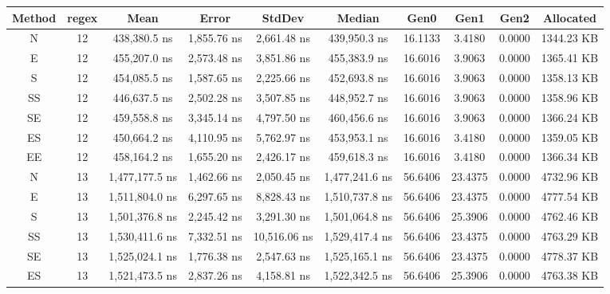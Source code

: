 \begin{sidewaystable}
    \begin{tabular}{|c|c|c|c|c|c|c|c|c|c|}
        \hline
        Method & regex & Mean           & Error        & StdDev       & Median         & Gen0     & Gen1     & Gen2   & Allocated   \\
        \hline
        N      & 12    & 438,380.5 ns   & 1,855.76 ns  & 2,661.48 ns  & 439,950.3 ns   & 16.1133  & 3.4180   & 0.0000 & 1344.23 KB  \\
        E      & 12    & 455,207.0 ns   & 2,573.48 ns  & 3,851.86 ns  & 455,383.9 ns   & 16.6016  & 3.9063   & 0.0000 & 1365.41 KB  \\
        S      & 12    & 454,085.5 ns   & 1,587.65 ns  & 2,225.66 ns  & 452,693.8 ns   & 16.6016  & 3.9063   & 0.0000 & 1358.13 KB  \\
        SS     & 12    & 446,637.5 ns   & 2,502.28 ns  & 3,507.85 ns  & 448,952.7 ns   & 16.6016  & 3.9063   & 0.0000 & 1358.96 KB  \\
        SE     & 12    & 459,558.8 ns   & 3,345.14 ns  & 4,797.50 ns  & 460,456.6 ns   & 16.6016  & 3.9063   & 0.0000 & 1366.24 KB  \\
        ES     & 12    & 450,664.2 ns   & 4,110.95 ns  & 5,762.97 ns  & 453,953.1 ns   & 16.6016  & 3.4180   & 0.0000 & 1359.05 KB  \\
        EE     & 12    & 458,164.2 ns   & 1,655.20 ns  & 2,426.17 ns  & 459,618.3 ns   & 16.6016  & 3.4180   & 0.0000 & 1366.34 KB  \\
        N      & 13    & 1,477,177.5 ns & 1,462.66 ns  & 2,050.45 ns  & 1,477,241.6 ns & 56.6406  & 23.4375  & 0.0000 & 4732.96 KB  \\
        E      & 13    & 1,511,804.0 ns & 6,297.65 ns  & 8,828.43 ns  & 1,510,737.8 ns & 56.6406  & 23.4375  & 0.0000 & 4777.54 KB  \\
        S      & 13    & 1,501,376.8 ns & 2,245.42 ns  & 3,291.30 ns  & 1,501,064.8 ns & 56.6406  & 25.3906  & 0.0000 & 4762.46 KB  \\
        SS     & 13    & 1,530,411.6 ns & 7,332.51 ns  & 10,516.06 ns & 1,529,417.4 ns & 56.6406  & 23.4375  & 0.0000 & 4763.29 KB  \\
        SE     & 13    & 1,525,024.1 ns & 1,776.38 ns  & 2,547.63 ns  & 1,525,165.1 ns & 56.6406  & 23.4375  & 0.0000 & 4778.37 KB  \\
        ES     & 13    & 1,521,473.5 ns & 2,837.26 ns  & 4,158.81 ns  & 1,522,342.5 ns & 56.6406  & 25.3906  & 0.0000 & 4763.38 KB  \\

\end{tabular}
\end{sidewaystable}
